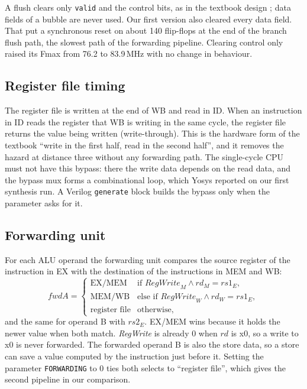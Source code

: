 A flush clears only \texttt{valid} and the control bits, as in the textbook
design \cite{patterson2021}; data fields of a bubble are never used. Our first
version also cleared every data field. That put a synchronous reset on about
140 flip-flops at the end of the branch flush path, the slowest path of the
forwarding pipeline. Clearing control only raised its Fmax from 76.2 to
83.9\,MHz with no change in behaviour.

\subsection{Register file timing}
The register file is written at the end of WB and read in ID. When an
instruction in ID reads the register that WB is writing in the same cycle,
the register file returns the value being written (write-through). This is the
hardware form of the textbook ``write in the first half, read in the second
half'', and it removes the hazard at distance three without any forwarding
path. The single-cycle CPU must not have this bypass: there the write data
depends on the read data, and the bypass mux forms a combinational loop, which
Yosys reported on our first synthesis run. A Verilog \texttt{generate} block
builds the bypass only when the parameter asks for it.

\subsection{Forwarding unit}
For each ALU operand the forwarding unit compares the source register of the
instruction in EX with the destination of the instructions in MEM and WB:
\begin{equation*}
\mathit{fwdA} =
\begin{cases}
\text{EX/MEM} & \text{if } \mathit{RegWrite}_{M} \wedge rd_{M} = rs1_{E},\\
\text{MEM/WB} & \text{else if } \mathit{RegWrite}_{W} \wedge rd_{W} = rs1_{E},\\
\text{register file} & \text{otherwise,}
\end{cases}
\end{equation*}
and the same for operand B with $rs2_{E}$. EX/MEM wins because it holds the
newer value when both match. \textit{RegWrite} is already 0 when $rd$ is
x0, so a write to x0 is never forwarded. The forwarded operand B is also the
store data, so a store can save a value computed by the instruction just
before it. Setting the parameter \texttt{FORWARDING} to 0 ties both selects
to ``register file'', which gives the second pipeline in our comparison.


